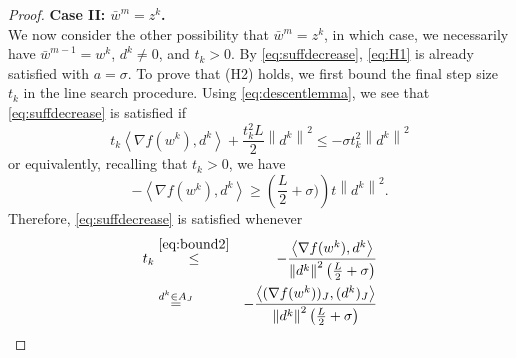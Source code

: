 \documentclass{article}
\theoremstyle{plain}
\theoremstyle{definition}
\theoremstyle{remark}
\newcommand\inner[2]{\left\langle #1, #2 \right\rangle}
\newcommand{\norm}[1]{{\left\|{#1}\right\|}}
\begin{document}
\begin{proof}
	\textbf{Case II: $\bar{w}^m = z^k$.}\\
	We now consider the other possibility that $\bar{w}^m = z^k$, in which 
	case, we 
	necessarily have $\bar{w}^{m-1} = w^k$, $d^k \neq 0$, and $t_k>0$. By 
	\cref{eq:suffdecrease}, \cref{eq:H1} is already satisfied with $a = \sigma$. 
	To prove that (H2) holds, we first bound the final step size $t_k$
	in the line search procedure.
	Using \cref{eq:descentlemma}, we see that
	\cref{eq:suffdecrease} is satisfied if
	\begin{equation*}
	t_k \inner{\nabla f(w^k)}{
		d^k} + \frac{{t}_k^2 L}{2} \norm{d^k}^2 \leq -\sigma
	t_k^2 \norm{d^k}^2 
	\end{equation*}
	or equivalently, recalling that $t_k>0$, we have
	\begin{equation}
	-\inner{\nabla f(w^k)}{d^k} \geq \left(\frac{L}{2} +
	\sigma)\right) t \norm{d^k}^2.
	\label{eq:bound2}
	\end{equation}
	Therefore, \cref{eq:suffdecrease} is satisfied whenever
	\begin{eqnarray}
		\nonumber
	t_k &\stackrel{\cref{eq:bound2}}{\leq} &
	- \frac{\inner{\nabla 
	f(w^k)}{ d^k}}{\norm{d^k}^2 \left( \frac{L}{2} + \sigma
\right)}\\
		\nonumber
	&\stackrel{d^k \in A_J}{=}&
	- \frac{\inner{(\nabla  f(w^k))_{J}}{(
			d^k)_J}}{\norm{d^k}^2 \left( \frac{L}{2} + \sigma \right)}\\
		\label{eq:lastbound}

\end{eqnarray}
\end{proof}
\end{document}
